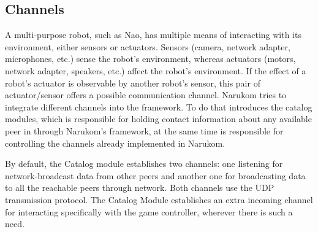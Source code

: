 \subsection{Channels}

A multi-purpose robot, such as Nao, has multiple means of interacting with its environment, either sensors or actuators.  Sensors (camera, network adapter,
microphones, etc.) sense the robot's environment, whereas actuators (motors, network adapter, speakers, etc.) affect the robot's environment.  If the effect of a robot's actuator is observable by another robot's sensor, this pair of actuator/sensor offers a possible communication channel. Narukom tries to integrate different channels into the framework. To do that introduces the catalog modules, which is responsible for holding contact information about any available peer in through Narukom's framework, at the same time is responsible for controlling the channels already implemented in Narukom.
 
 By default, the Catalog module establishes two channels: one listening for network-broadcast data from other peers and
another one for broadcasting data to all the reachable peers through network. Both channels use the UDP transmission
protocol. The Catalog Module establishes an extra incoming channel for interacting specifically with the game
controller, wherever there is such a need.

